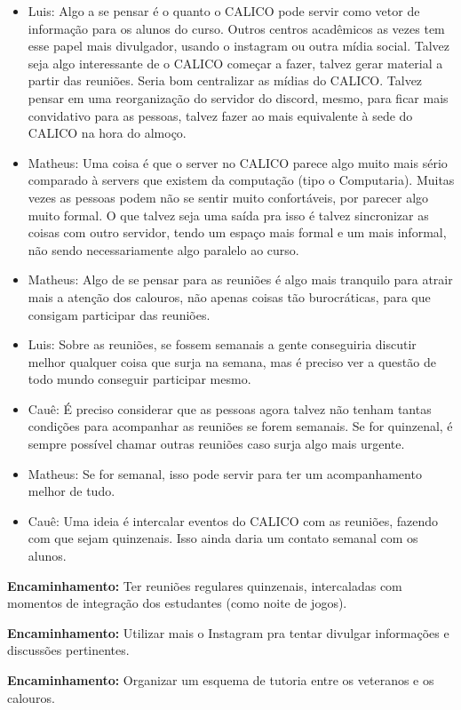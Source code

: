\documentclass{ata-calico}
\begin{document}
\begin{itemize}
\item Luis: Algo a se pensar é o quanto o CALICO pode servir como vetor de informação para os alunos do curso. Outros centros acadêmicos as vezes tem esse papel mais divulgador, usando o instagram ou outra mídia social. Talvez seja algo interessante de o CALICO começar a fazer, talvez gerar material a partir das reuniões. Seria bom centralizar as mídias do CALICO. Talvez pensar em uma reorganização do servidor do discord, mesmo, para ficar mais convidativo para as pessoas, talvez fazer ao mais equivalente à sede do CALICO na hora do almoço.
\item Matheus: Uma coisa é que o server no CALICO parece algo muito mais sério comparado à servers que existem da computação (tipo o Computaria). Muitas vezes as pessoas podem não se sentir muito confortáveis, por parecer algo muito formal. O que talvez seja uma saída pra isso é talvez sincronizar as coisas com outro servidor, tendo um espaço mais formal e um mais informal, não sendo necessariamente algo paralelo ao curso.
\item Matheus: Algo de se pensar para as reuniões é algo mais tranquilo para atrair mais a atenção dos calouros, não apenas coisas tão burocráticas, para que consigam participar das reuniões.
\item Luis: Sobre as reuniões, se fossem semanais a gente conseguiria discutir melhor qualquer coisa que surja na semana, mas é preciso ver a questão de todo mundo conseguir participar mesmo.
\item Cauê: É preciso considerar que as pessoas agora talvez não tenham tantas condições para acompanhar as reuniões se forem semanais. Se for quinzenal, é sempre possível chamar outras reuniões caso surja algo mais urgente.
\item Matheus: Se for semanal, isso pode servir para ter um acompanhamento melhor de tudo.
\item Cauê: Uma ideia é intercalar eventos do CALICO com as reuniões, fazendo com que sejam quinzenais. Isso ainda daria um contato semanal com os alunos.
\end{itemize}

\textbf{Encaminhamento:} Ter reuniões regulares quinzenais, intercaladas com momentos de integração dos estudantes (como noite de jogos).

\textbf{Encaminhamento:} Utilizar mais o Instagram pra tentar divulgar informações e discussões pertinentes.

\textbf{Encaminhamento:} Organizar um esquema de tutoria entre os veteranos e os calouros.

\end{document}
